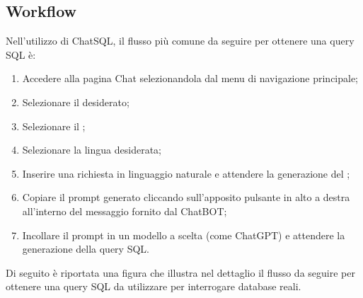 \subsection{Workflow}
\par Nell'utilizzo di ChatSQL, il flusso più comune da seguire per ottenere una query SQL è:
\begin{enumerate}
  \item Accedere alla pagina Chat selezionandola dal menu di navigazione principale;
  \item Selezionare il  desiderato;
  \item Selezionare il ;
  \item Selezionare la lingua desiderata;
  \item Inserire una richiesta in linguaggio naturale e attendere la generazione del ;
  \item Copiare il prompt generato cliccando sull'apposito pulsante in alto a destra all'interno del messaggio fornito dal ChatBOT;
  \item Incollare il prompt in un modello  a scelta (come ChatGPT) e attendere la generazione della query SQL.
\end{enumerate}

\vspace{0.5\baselineskip}
\par Di seguito è riportata una figura che illustra nel dettaglio il flusso da seguire per ottenere una query SQL da utilizzare per interrogare database reali.

